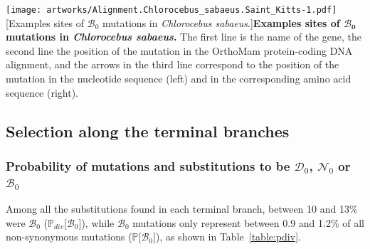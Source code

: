 \documentclass{article}
\newcommand{\proba}{\mathbb{P}}
\newcommand{\SphyDel}{\mathcal{D}_0}
\newcommand{\SphyNeu}{\mathcal{N}_0}
\newcommand{\SphyBen}{\mathcal{B}_0}
\begin{document}
    \newpage
    \begin{center}
        \texttt{[image: artworks/Alignment.Chlorocebus\_sabaeus.Saint\_Kitts-1.pdf]}
        [Examples sites of $\SphyBen$ mutations in \textit{Chlorocebus sabaeus}.]{\textbf{Examples sites of $\bm{\SphyBen}$ mutations in \textit{Chlorocebus sabaeus}.} The first line is the name of the gene, the second line the position of the mutation in the OrthoMam protein-coding DNA alignment, and the arrows in the third line correspond to the position of the mutation in the nucleotide sequence (left) and in the corresponding amino acid sequence (right).\label{fig:example-2}}
    \end{center}

    \newpage
    \subsection{Selection along the terminal branches}\label{subsec:summary-table-mutsel}

    \subsubsection{Probability of mutations and substitutions to be \texorpdfstring{$\SphyDel$}{D₀}, \texorpdfstring{$\SphyNeu$}{N₀} or \texorpdfstring{$\SphyBen$}{B₀}}
    Among all the substitutions found in each terminal branch, between 10 and 13\% were $\SphyBen$ ($\proba_{div}[ \SphyBen {]}$), while $\SphyBen$ mutations only represent between 0.9 and 1.2\% of all non-synonymous mutations ($\proba[ \SphyBen {]}$), as shown in Table~\ref{table:pdiv}.
\end{document}
